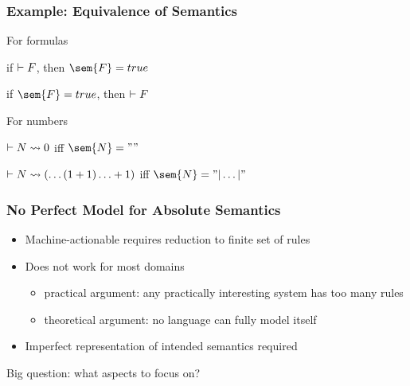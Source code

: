 \begin{frame}\frametitle{Example: Equivalence of Semantics}
\begin{blockitems}{For formulas}
\item if $\vdash F$, then $\sem{F}=true$ 
\item if $\sem{F}=true$, then $\vdash F$
\end{blockitems}

\begin{blockitems}{For numbers}
\item $\vdash N\rightsquigarrow 0$ iff $\sem{N}=""$
\item $\vdash N\rightsquigarrow (\ldots(1+1)\ldots+1)$ iff $\sem{N}="|\ldots|"$
\end{blockitems}
\end{frame}

\begin{frame}\frametitle{No Perfect Model for Absolute Semantics}
\begin{itemize}
\item Machine-actionable requires reduction to finite set of rules
\item Does not work for most domains
 \begin{itemize}
 \item practical argument: any practically interesting system has too many rules
 \item theoretical argument: no language can fully model itself
 \end{itemize}
\item Imperfect representation of intended semantics required
\end{itemize}

Big question: what aspects to focus on?
\end{frame}

